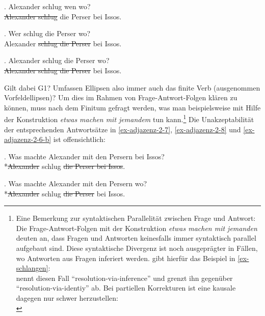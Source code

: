 \ex. \label{ex-adjazenz-2-1} Alexander schlug wen wo? \\
\sout{Alexander schlug} die Perser bei Issos.

\ex. \label{ex-adjazenz-2-2} Wer schlug die Perser wo? \\
 Alexander \sout{schlug die Perser} bei Issos.

\ex. \label{ex-adjazenz-2-3} Alexander schlug die Perser wo? \\
 \sout{Alexander schlug die Perser} bei Issos.

Gilt dabei G1? Umfassen Ellipsen also immer auch das finite Verb (ausgenommen Vorfeldellipsen)? Um dies im Rahmen von Frage-Antwort-Folgen klären zu können, muss nach dem Finitum gefragt werden, was man beispielsweise mit Hilfe der Konstruktion {\it etwas machen mit jemandem} tun kann.\footnote{Eine Bemerkung zur syntaktischen Parallelität zwischen Frage und Antwort: Die Frage-Antwort-Folgen mit der Konstruktion {\it etwas machen mit jemanden} deuten an, dass Fragen und Antworten keinesfalls immer syntaktisch parallel aufgebaut sind. Diese syntaktische Divergenz ist noch ausgeprägter in Fällen, wo Antworten aus Fragen inferiert werden. \cite{Schlangen:03} gibt hierfür das Beispiel in \ref{ex-schlangen}:\\
\cite{Schlangen:03} nennt diesen Fall "`resolution-via-inference"' und grenzt ihn gegenüber "`resolution-via-identiy"' ab. Bei partiellen Korrekturen ist eine kausale  dagegen nur schwer herzustellen:\\ 
} Die Unakzeptabilität der entsprechenden Antwortsätze in \ref{ex-adjazenz-2-7}, \ref{ex-adjazenz-2-8} und \ref{ex-adjazenz-2-6-b} ist offensichtlich:   

\ex. \label{ex-adjazenz-2-7} Was machte Alexander mit den Persern bei Issos? \\
*\sout{Alexander} schlug \sout{die Perser bei Issos}. 

\ex. \label{ex-adjazenz-2-8} Was machte Alexander mit den Persern wo? \\
*\sout{Alexander} schlug \sout{die Perser}  bei Issos.

